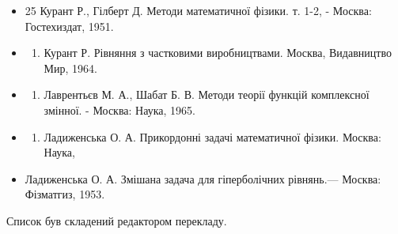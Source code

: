 \documentclass[
  ukrainian,
]{article}
\providecommand{\tightlist}{%
  \setlength{\itemsep}{0pt}\setlength{\parskip}{0pt}}
\begin{document}
\begin{itemize}
\begin{enumerate}
    Наука, 1978.
  \end{enumerate}
\item
  25 Курант Р., Гілберт Д. Методи математичної фізики. т. 1-2, - Москва:
  Гостехиздат, 1951.
\item
  \begin{enumerate}
  \def\labelenumi{\arabic{enumi}.}
  \setcounter{enumi}{26}
  \tightlist
  \item
    Курант Р. Рівняння з частковими виробництвами. Москва, Видавництво
    Мир, 1964.
  \end{enumerate}
\item
  \begin{enumerate}
  \def\labelenumi{\arabic{enumi}.}
  \setcounter{enumi}{27}
  \tightlist
  \item
    Лаврентьєв М. А., Шабат Б. В. Методи теорії функцій комплексної
    змінної. - Москва: Наука, 1965.
  \end{enumerate}
\item
  \begin{enumerate}
  \def\labelenumi{\arabic{enumi}.}
  \setcounter{enumi}{28}
  \tightlist
  \item
    Ладиженська О. А. Прикордонні задачі математичної фізики. Москва:
    Наука,
  \end{enumerate}
\item
  Ладиженська О. А. Змішана задача для гіперболічних рівнянь.--- Москва:
  Фізматгиз, 1953.
\end{itemize}

Список був складений редактором перекладу.
\end{document}
